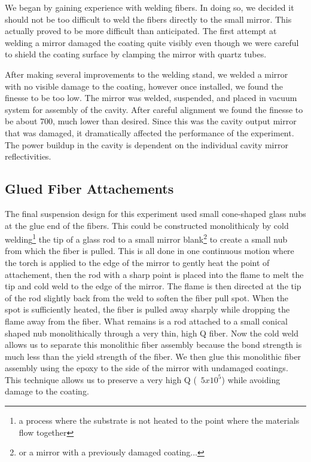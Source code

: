 We began by gaining experience with welding fibers. In doing so, we decided it
should not be too difficult to weld the fibers directly to the small mirror.
This actually proved to be more difficult than anticipated.
The first attempt at welding a mirror damaged the coating quite visibly even
though we were careful to shield the coating surface by clamping the mirror
with quartz tubes.

After making several improvements to the welding stand, we welded a mirror
with no visible damage to the coating, however once installed, we found the
finesse to be too low.
The mirror was welded, suspended, and placed in vacuum system
for assembly of the cavity.
After careful alignment we found the finesse to be about 700, much lower than
desired.
Since this was the cavity output mirror that was damaged, it dramatically
affected the performance of the experiment.
The power buildup in the cavity is dependent on the
individual cavity mirror reflectivities.

\subsection{Glued Fiber Attachements}

The final suspension design for this experiment used small cone-shaped glass
nubs at the glue end of the fibers. This could be constructed monolithicaly
by cold welding\footnote{a process where the substrate is not heated to the
point where the materials flow together} the tip of a glass rod to a small
mirror blank\footnote{or a mirror with a previously damaged coating...} to
create a small nub from which the fiber is pulled. This is all done in one
continuous motion where the torch is applied to the edge of the mirror to
gently heat the point of attachement, then the rod with a sharp point is placed
into the flame to melt the tip and cold weld to the edge of the mirror. The
flame is then directed at the tip of the rod slightly back from the weld to
soften the fiber pull spot. When the spot is sufficiently heated, the fiber
is pulled away sharply while dropping the flame away from the fiber. What
remains is a rod attached to a small conical shaped nub monolithically through
a very thin, high Q fiber. Now the cold weld allows us to separate this
monolithic fiber assembly because the bond strength is much less than the yield
strength of the fiber. We then glue this monolithic fiber assembly using the
epoxy to the side of the mirror with undamaged coatings. This technique allows
us to preserve a very high Q (~$5x10^5$) while avoiding damage to the coating.

